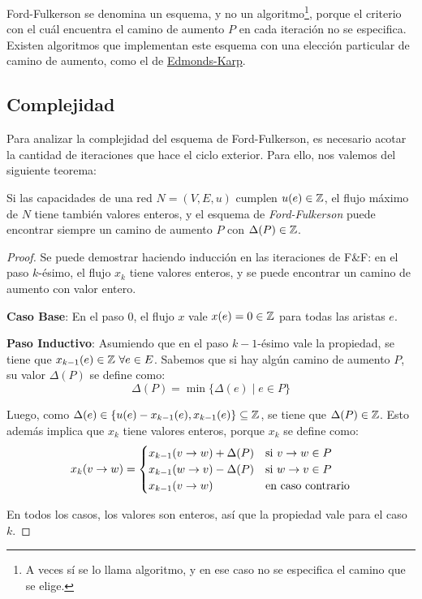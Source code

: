 Ford-Fulkerson se denomina un esquema, y no un algoritmo\footnote{A veces sí se lo llama algoritmo, y en ese caso no se especifica el camino que se elige.}, porque el criterio con el cuál encuentra el camino de aumento $P$ en cada iteración no se especifica. Existen algoritmos que implementan este esquema con una elección particular de camino de aumento, como el de \hyperref[edmonds-karp]{Edmonds-Karp}.

\subsection{Complejidad}
Para analizar la complejidad del esquema de Ford-Fulkerson, es necesario acotar la cantidad de iteraciones que hace el ciclo exterior. Para ello, nos valemos del siguiente teorema:

\begin{theorem*}
    Si las capacidades de una red $N = (V, E, u)$ cumplen $u(e) \in \mathbb{Z}$, el flujo máximo de $N$ tiene también valores enteros, y el esquema de \textit{Ford-Fulkerson} puede encontrar siempre un camino de aumento $P$ con $\Delta(P) \in \mathbb{Z}$.
\end{theorem*}
\begin{proof}
    Se puede demostrar haciendo inducción en las iteraciones de F\&F: en el paso $k$-ésimo, el flujo $x_k$ tiene valores enteros, y se puede encontrar un camino de aumento con valor entero.

    \textbf{Caso Base}: En el paso $0$, el flujo $x$ vale $x(e) = 0 \in \mathbb{Z}$ para todas las aristas $e$.

    \textbf{Paso Inductivo}: Asumiendo que en el paso $k - 1$-ésimo vale la propiedad, se tiene que $x_{k - 1}(e) \in \mathbb{Z}\ \forall e \in E$. Sabemos que si hay algún camino de aumento $P$, su valor $\Delta(P)$ se define como:
    $$\Delta(P) = \min{\{\Delta(e) \mid e \in P\}}$$

    Luego, como $\Delta(e) \in \{u(e) - x_{k - 1}(e), x_{k - 1}(e)\} \subseteq \mathbb{Z}$, se tiene que $\Delta(P) \in \mathbb{Z}$. Esto además implica que $x_k$ tiene valores enteros, porque $x_k$ se define como:
    $$
        x_k(v \rightarrow w) =
        \begin{cases}
            x_{k - 1}(v \rightarrow w) + \Delta(P) & \text{si } v \rightarrow w \in P \\
            x_{k - 1}(w \rightarrow v) - \Delta(P) & \text{si } w \rightarrow v \in P \\
            x_{k - 1}(v \rightarrow w)             & \text{en caso contrario}
        \end{cases}$$

    En todos los casos, los valores son enteros, así que la propiedad vale para el caso $k$.

\end{proof}


